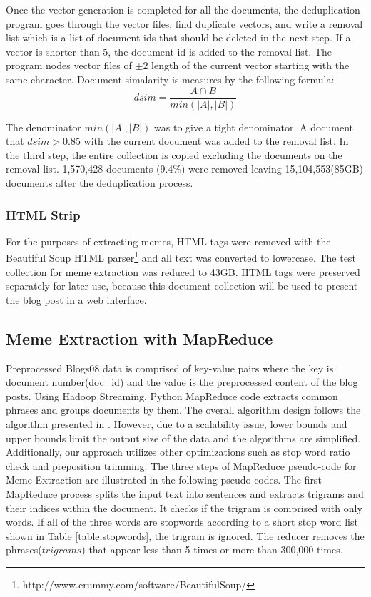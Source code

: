 \documentclass{sig-alternate}
\begin{document}
Once the vector generation is completed for all the documents, the deduplication program goes through the vector files, find duplicate vectors, and write a removal list which is a list of document ids that should be deleted in the next step. If a vector is shorter than 5, the document id is added to the removal list. The program nodes vector files of $\pm 2$ length of the current vector starting with the same character. Document simalarity is measures by the following formula:
\begin{displaymath}
dsim=\frac{A \cap B}  {min(|A|, |B|)}
\end{displaymath}

The denominator $min(|A|, |B|)$ was to give a tight denominator. A document that $dsim > 0.85$ with the current document was added to the removal list. In the third step, the entire collection is copied excluding the documents on the removal list. 1,570,428 documents (9.4\%) were removed leaving 15,104,553(85GB) documents after the deduplication process.

\subsubsection{HTML Strip}

For the purposes of extracting memes, HTML tags were removed with the Beautiful Soup HTML parser\footnote{http://www.crummy.com/software/BeautifulSoup/} and all text was converted to lowercase.  The test collection for meme extraction was reduced to 43GB.  HTML tags were preserved separately for later use, because this document collection will be used to present the blog post in a web interface.

\subsection{Meme Extraction with MapReduce}

Preprocessed Blogs08 data is comprised of key-value pairs where the key is document number(doc\_id) and the value is the preprocessed content of the blog posts. Using Hadoop Streaming, Python MapReduce code extracts common phrases and groups documents by them. The overall algorithm design follows the algorithm presented in \cite{Kolak2008}. However, due to a scalability issue, lower bounds and upper bounds limit the output size of the data and the algorithms are simplified.  Additionally, our approach utilizes other optimizations such as stop word ratio check and preposition trimming. The three steps of MapReduce pseudo-code for Meme Extraction are illustrated in the following pseudo codes. The first MapReduce process splits the input text into sentences and extracts trigrams and their indices within the document. It checks if the trigram is comprised with only words. If all of the three words are stopwords according to a short stop word list shown in Table \ref{table:stopwords}, the trigram is ignored. The reducer removes the phrases($trigrams$) that appear less than 5 times or more than 300,000 times.
\end{document}
